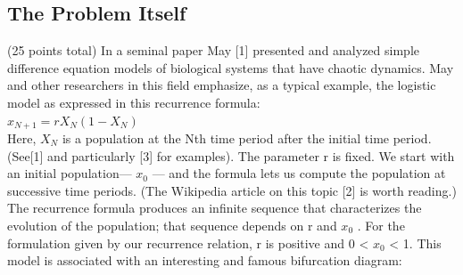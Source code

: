 \subsection{The Problem Itself}
(25 points total) In a seminal paper May [1] presented and analyzed simple difference equation
models of biological systems that have chaotic dynamics. May and other researchers in this field
emphasize, as a typical example, the logistic model as expressed in this recurrence formula: \\ 
$x_{N+1}=rX_N(1-X_N)$ \\ 
Here, $X_N$ is a population at the Nth time period after the initial time period. (See[1] and particularly [3] for examples). The parameter r is fixed. We start with an initial population— $x_0$
 —
and the formula lets us compute the population at successive time periods. (The Wikipedia article
on this topic [2] is worth reading.) The recurrence formula produces an infinite sequence that
characterizes the evolution of the population; that sequence depends on r and $x_0$
.
For the formulation given by our recurrence relation, r is positive and 0 < $x_0$ < 1.
This model is associated with an interesting and famous bifurcation diagram: \\ 


